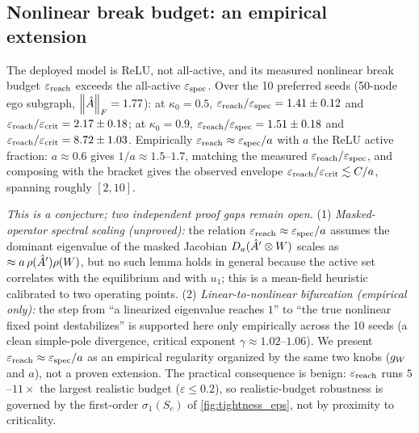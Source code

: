 \subsection{Nonlinear break budget: an empirical extension}
\label{app:bracket-o1}

\begin{remark}
\label{rem:obs_o1}
The deployed model is ReLU, not all-active, and its measured nonlinear break budget $\varepsilon_{\mathrm{reach}}$ exceeds
the all-active $\varepsilon_{\mathrm{spec}}$. Over the 10 preferred seeds (50-node ego subgraph, $\left\|\hat{A}\right\|_F=1.77$): at
$\kappa_0=0.5$, $\varepsilon_{\mathrm{reach}}/\varepsilon_{\mathrm{spec}}=1.41\pm0.12$ and $\varepsilon_{\mathrm{reach}}/\varepsilon_{\mathrm{crit}}=2.17\pm0.18$; at $\kappa_0=0.9$,
$\varepsilon_{\mathrm{reach}}/\varepsilon_{\mathrm{spec}}=1.51\pm0.18$ and $\varepsilon_{\mathrm{reach}}/\varepsilon_{\mathrm{crit}}=8.72\pm1.03$. Empirically $\varepsilon_{\mathrm{reach}}\approx\varepsilon_{\mathrm{spec}}/a$ with
$a$ the ReLU active fraction: $a\approx0.6$ gives $1/a\approx1.5$--$1.7$, matching the measured
$\varepsilon_{\mathrm{reach}}/\varepsilon_{\mathrm{spec}}$, and composing with the bracket gives the observed envelope $\varepsilon_{\mathrm{reach}}/\varepsilon_{\mathrm{crit}}\lesssim C/a$,
spanning roughly $[2,10]$.

\emph{This is a conjecture; two independent proof gaps remain open.} (1) \emph{Masked-operator spectral
scaling (unproved):} the relation $\varepsilon_{\mathrm{reach}}\approx\varepsilon_{\mathrm{spec}}/a$ assumes the dominant eigenvalue of the masked
Jacobian $D_a(\hat{A}'\otimes W)$ scales as $\approx a\,\rho(\hat{A}')\rho(W)$, but no such lemma holds in
general because the active set correlates with the equilibrium and with $u_1$; this is a mean-field
heuristic calibrated to two operating points. (2) \emph{Linear-to-nonlinear bifurcation (empirical
only):} the step from ``a linearized eigenvalue reaches $1$'' to ``the true nonlinear fixed point
destabilizes'' is supported here only empirically across the 10 seeds (a clean simple-pole divergence,
critical exponent $\gamma\approx1.02$--$1.06$). We present $\varepsilon_{\mathrm{reach}}\approx\varepsilon_{\mathrm{spec}}/a$ as an empirical
regularity organized by the same two knobs ($g_W$ and $a$), not a proven extension. The practical
consequence is benign: $\varepsilon_{\mathrm{reach}}$ runs $5$--$11\times$ the largest realistic budget ($\varepsilon\le0.2$),
so realistic-budget robustness is governed by the first-order $\sigma_1(S_c)$ of
\cref{fig:tightness_eps}, not by proximity to criticality.
\end{remark}

